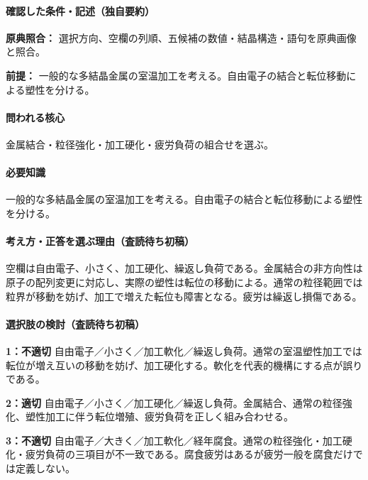 \paragraph{確認した条件・記述（独自要約）}\mbox{}\par

\noindent\textbf{原典照合：} 選択方向、空欄の列順、五候補の数値・結晶構造・語句を原典画像と照合。\par

\noindent\textbf{前提：} 一般的な多結晶金属の室温加工を考える。自由電子の結合と転位移動による塑性を分ける。\par

\paragraph{問われる核心} 金属結合・粒径強化・加工硬化・疲労負荷の組合せを選ぶ。

\paragraph{必要知識} 一般的な多結晶金属の室温加工を考える。自由電子の結合と転位移動による塑性を分ける。

\paragraph{考え方・正答を選ぶ理由（査読待ち初稿）} 空欄は自由電子、小さく、加工硬化、繰返し負荷である。金属結合の非方向性は原子の配列変更に対応し、実際の塑性は転位の移動による。通常の粒径範囲では粒界が移動を妨げ、加工で増えた転位も障害となる。疲労は繰返し損傷である。

\paragraph{選択肢の検討（査読待ち初稿）}\mbox{}\par

\noindent\textbf{1：不適切} 自由電子／小さく／加工軟化／繰返し負荷。通常の室温塑性加工では転位が増え互いの移動を妨げ、加工硬化する。軟化を代表的機構にする点が誤りである。\par

\noindent\textbf{2：適切} 自由電子／小さく／加工硬化／繰返し負荷。金属結合、通常の粒径強化、塑性加工に伴う転位増殖、疲労負荷を正しく組み合わせる。\par

\noindent\textbf{3：不適切} 自由電子／大きく／加工軟化／経年腐食。通常の粒径強化・加工硬化・疲労負荷の三項目が不一致である。腐食疲労はあるが疲労一般を腐食だけでは定義しない。\par

